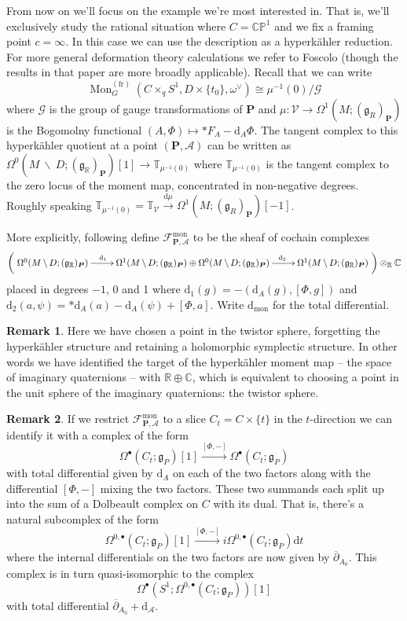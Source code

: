 \documentclass[11pt, oneside, reqno]{amsart}
\theoremstyle{definition} \newtheorem{definition}{Definition}[section]
\theoremstyle{definition} \newtheorem{remark}[definition]{Remark}
\theoremstyle{definition} \newtheorem{remarks}[definition]{Remarks}
\theoremstyle{definition} \newtheorem{question}[definition]{Question}
\theoremstyle{definition} \newtheorem*{note}{Note}
\theoremstyle{definition} \newtheorem{example}[definition]{Example}
\theoremstyle{definition} \newtheorem{examples}[definition]{Examples}
\renewcommand{\gg}{\mathfrak{g}}
\newcommand{\bb}[1]{\mathbb{#1}}
\newcommand{\mr}[1]{\mathrm{#1}}
\newcommand{\mc}[1]{\mathcal{#1}}
\newcommand{\bo}[1]{\boldsymbol{#1}}
\newcommand{\bs}{\ \backslash \ }
\newcommand{\dd}{\partial}
\newcommand{\ol}[1]{\overline{#1}}
\newcommand{\CC}{\mathbb{C}}
\newcommand{\RR}{\mathbb{R}}
\newcommand{\iso}{\cong}
\DeclareMathOperator{\mon}{Mon}
\renewcommand{\d}{\mathrm{d}}
\newcommand{\fr}{\mathrm{fr}}
\begin{document}
From now on we'll focus on the example we're most interested in.  That is, we'll exclusively study the rational situation where $C = \bb{CP}^1$ and we fix a framing point $c = \infty$.  In this case we can use the description as a hyperk\"ahler reduction.  For more general deformation theory calculations we refer to Foscolo \cite{FoscoloDef} (though the results in that paper are more broadly applicable).  Recall that we can write
\[\mon^{(\fr)}_G(C \times_q S^1, D \times \{t_0\}, \omega^\vee) \iso \mu^{-1}(0)/ \mc G\]
where $\mc G$ is the group of gauge transformations of $\bo P$ and $\mu \colon \mc V \to \Omega^1(M; (\gg_R)_{\bo P})$ is the Bogomolny functional $(A,\Phi) \mapsto \ast F_A - \d_A \Phi$.  The tangent complex to this hyperk\"ahler quotient at a point $(\bo P, \mc A)$ can be written as $\Omega^0(M \!\bs\! D; (\gg_\RR)_{\bo P})[1] \to \bb T_{\mu^{-1}(0)}$ where $\bb T_{\mu^{-1}(0)}$ is the tangent complex to the zero locus of the moment map, concentrated in non-negative degrees. Roughly speaking $\bb T_{\mu^{-1}(0)} = \bb T_{\mc V} \overset {\d\mu} \to \Omega^1(M; (\gg_R)_{\bo P})[-1]$.  

More explicitly, following \cite{FoscoloDef} define $\mc F^{\mr{mon}}_{\bo P, \mc A}$ to be the sheaf of cochain complexes
\[\left(\xymatrix{
\Omega^0(M \!\bs\! D; (\gg_\RR)_{\bo P}) \ar[r]^(.36){\d_1} &\Omega^1(M \!\bs\! D; (\gg_\RR)_{\bo P}) \oplus \Omega^0(M \!\bs\! D; (\gg_\RR)_{\bo P}) \ar[r]^(.64){\d_2} &\Omega^1(M \!\bs\! D; (\gg_\RR)_{\bo P})
}\right) \otimes_\RR \CC\]
placed in degrees $-1$, 0 and 1 where $\d_1(g) = -(\d_A(g),[\Phi, g])$ and $\d_2(a,\psi) = \ast \d_A(a) - \d_A(\psi) + [\Phi,a]$.  Write $\d_{\mr{mon}}$ for the total differential.

\begin{remark}
Here we have chosen a point in the twistor sphere, forgetting the hyperk\"ahler structure and retaining a holomorphic symplectic structure.  In other words we have identified the target of the hyperk\"ahler moment map -- the space of imaginary quaternions -- with $\RR \oplus \CC$, which is equivalent to choosing a point in the unit sphere of the imaginary quaternions: the twistor sphere.  
\end{remark}

\begin{remark} \label{monopole_holo_restriction_rmk}
If we restrict $\mc F^{\mr{mon}}_{\bo P, \mc A}$ to a slice $C_t = C \times \{t\}$ in the $t$-direction we can identify it with a complex of the form
\[\Omega^\bullet(C_t; \gg_P)[1] \overset {[\Phi,-]} \to \Omega^\bullet(C_t; \gg_P)\]
with total differential given by $\d_A$ on each of the two factors along with the differential $[\Phi,-]$ mixing the two factors.  These two summands each split up into the sum of a Dolbeault complex on $C$ with its dual.  That is, there's a natural subcomplex of the form
\[\Omega^{0,\bullet}(C_t; \gg_P)[1] \overset {[\Phi,-]} \to i \Omega^{0,\bullet}(C_t; \gg_P) \d t\]
where the internal differentials on the two factors are now given by $\ol \dd_{A_0}$.  This complex is in turn quasi-isomorphic to the complex
\[\Omega^\bullet(S^1; \Omega^{0,\bullet}(C_t;\gg_P))[1]\]
with total differential $\ol \dd_{A_0} + \d_{\mc A}$.
\end{remark}
\end{document}
